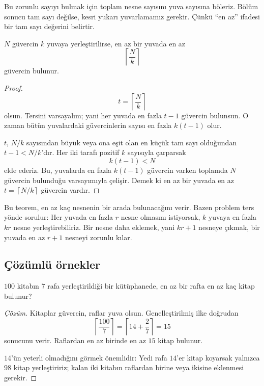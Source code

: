 Bu zorunlu sayıyı bulmak için toplam nesne sayısını yuva sayısına böleriz. Bölüm sonucu tam sayı değilse, kesri yukarı yuvarlamamız gerekir. Çünkü ``en az'' ifadesi bir tam sayı değerini belirtir.

\begin{theorem}
$N$ güvercin $k$ yuvaya yerleştirilirse, en az bir yuvada en az
\[
\left\lceil\frac{N}{k}\right\rceil
\]
güvercin bulunur.
\end{theorem}

\begin{proof}
\[
t=\left\lceil\frac{N}{k}\right\rceil
\]
olsun. Tersini varsayalım; yani her yuvada en fazla $t-1$ güvercin bulunsun. O zaman bütün yuvalardaki güvercinlerin sayısı en fazla $k(t-1)$ olur.

$t$, $N/k$ sayısından büyük veya ona eşit olan en küçük tam sayı olduğundan $t-1<N/k$'dır. Her iki tarafı pozitif $k$ sayısıyla çarparsak
\[
k(t-1)<N
\]
elde ederiz. Bu, yuvalarda en fazla $k(t-1)$ güvercin varken toplamda $N$ güvercin bulunduğu varsayımıyla çelişir. Demek ki en az bir yuvada en az $t=\left\lceil N/k\right\rceil$ güvercin vardır.
\end{proof}

Bu teorem, en az kaç nesnenin bir arada bulunacağını verir. Bazen problem ters yönde sorulur: Her yuvada en fazla $r$ nesne olmasını istiyorsak, $k$ yuvaya en fazla $kr$ nesne yerleştirebiliriz. Bir nesne daha eklemek, yani $kr+1$ nesneye çıkmak, bir yuvada en az $r+1$ nesneyi zorunlu kılar.

\subsection{Çözümlü örnekler}

\begin{example}
$100$ kitabın $7$ rafa yerleştirildiği bir kütüphanede, en az bir rafta en az kaç kitap bulunur?
\end{example}
\begin{proof}[Çözüm]
Kitaplar güvercin, raflar yuva olsun. Genelleştirilmiş ilke doğrudan
\[
\left\lceil\frac{100}{7}\right\rceil
=\left\lceil14+\frac{2}{7}\right\rceil=15
\]
sonucunu verir. Raflardan en az birinde en az $15$ kitap bulunur.

$14$'ün yeterli olmadığını görmek önemlidir: Yedi rafa $14$'er kitap koyarsak yalnızca $98$ kitap yerleştiririz; kalan iki kitabın raflardan birine veya ikisine eklenmesi gerekir.
\end{proof}

